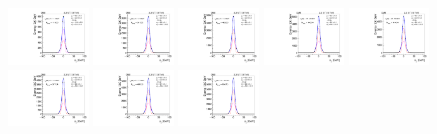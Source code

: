 \begin{figure}[htb]
\ContinuedFloat
\centering
\includegraphics[width=0.19\textwidth]{plots/Appendix_Recoil_Fits/WmmMC_PF_13TeV_2G/pfu2fit_0.pdf}
\includegraphics[width=0.19\textwidth]{plots/Appendix_Recoil_Fits/WmmMC_PF_13TeV_2G/pfu2fit_1.pdf}
\includegraphics[width=0.19\textwidth]{plots/Appendix_Recoil_Fits/WmmMC_PF_13TeV_2G/pfu2fit_2.pdf}
\includegraphics[width=0.19\textwidth]{plots/Appendix_Recoil_Fits/WmmMC_PF_13TeV_2G/pfu2fit_3.pdf}
\includegraphics[width=0.19\textwidth]{plots/Appendix_Recoil_Fits/WmmMC_PF_13TeV_2G/pfu2fit_4.pdf}
\includegraphics[width=0.19\textwidth]{plots/Appendix_Recoil_Fits/WmmMC_PF_13TeV_2G/pfu2fit_5.pdf}
\includegraphics[width=0.19\textwidth]{plots/Appendix_Recoil_Fits/WmmMC_PF_13TeV_2G/pfu2fit_6.pdf}
\includegraphics[width=0.19\textwidth]{plots/Appendix_Recoil_Fits/WmmMC_PF_13TeV_2G/pfu2fit_7.pdf}

\end{figure}
